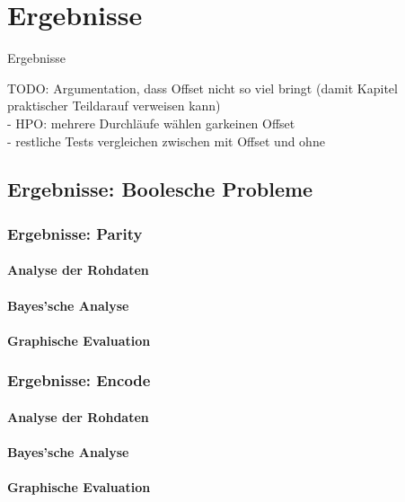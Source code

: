 \chapter{Ergebnisse}
\label{Ergebnisse}
Ergebnisse

TODO: Argumentation, dass Offset nicht so viel bringt (damit Kapitel \glqq praktischer Teil\grqq\space darauf verweisen kann)\\
- HPO: mehrere Durchläufe wählen garkeinen Offset\\
- restliche Tests vergleichen zwischen mit Offset und ohne

\section{Ergebnisse: Boolesche Probleme}
\label{sec:ergebnisseBP}

\subsection{Ergebnisse: Parity}
\label{subsec:ergebnisseParity}
\subsubsection{Analyse der Rohdaten}
\label{parity:analyseRohdaten}
\subsubsection{Bayes'sche Analyse}
\label{parity:bayes}
\subsubsection{Graphische Evaluation}
\label{parity: graphische Evaluation}

\subsection{Ergebnisse: Encode}
\label{subsec:ergebnisseEncode}
\subsubsection{Analyse der Rohdaten}
\label{encode:analyseRohdaten}
\subsubsection{Bayes'sche Analyse}
\label{encode:bayes}
\subsubsection{Graphische Evaluation}
\label{encode: graphische Evaluation}


